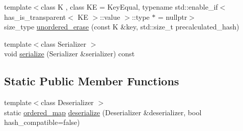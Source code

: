 \begin{DoxyCompactItemize}
\item 
{\footnotesize template$<$class K , class KE  = Key\+Equal, typename std\+::enable\+\_\+if$<$ has\+\_\+is\+\_\+transparent$<$ K\+E $>$\+::value $>$\+::type $\ast$  = nullptr$>$ }\\size\+\_\+type \mbox{\hyperlink{classtsl_1_1ordered__map_ac13787e3ff3e2c7ffbdd7f4f7b8ce081}{unordered\+\_\+erase}} (const K \&key, std\+::size\+\_\+t precalculated\+\_\+hash)
\item 
{\footnotesize template$<$class Serializer $>$ }\\void \mbox{\hyperlink{classtsl_1_1ordered__map_a1abbf43a96014093fbd80a2f55b87a30}{serialize}} (Serializer \&serializer) const
\end{DoxyCompactItemize}
\subsection*{Static Public Member Functions}
\begin{DoxyCompactItemize}
\item 
{\footnotesize template$<$class Deserializer $>$ }\\static \mbox{\hyperlink{classtsl_1_1ordered__map}{ordered\+\_\+map}} \mbox{\hyperlink{classtsl_1_1ordered__map_a29bb8bff9283ad24501b9b3fbdeeb478}{deserialize}} (Deserializer \&deserializer, bool hash\+\_\+compatible=false)
\end{DoxyCompactItemize}
